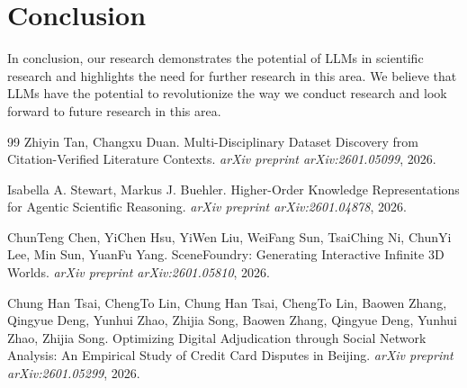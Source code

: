 \documentclass{article}
\begin{document}
\section{Conclusion}
In conclusion, our research demonstrates the potential of LLMs in scientific research and highlights the need for further research in this area. We believe that LLMs have the potential to revolutionize the way we conduct research and look forward to future research in this area.

\begin{thebibliography}{99}
Zhiyin Tan, Changxu Duan. Multi-Disciplinary Dataset Discovery from Citation-Verified Literature Contexts. \textit{arXiv preprint arXiv:2601.05099}, 2026.

Isabella A. Stewart, Markus J. Buehler. Higher-Order Knowledge Representations for Agentic Scientific Reasoning. \textit{arXiv preprint arXiv:2601.04878}, 2026.

ChunTeng Chen, YiChen Hsu, YiWen Liu, WeiFang Sun, TsaiChing Ni, ChunYi Lee, Min Sun, YuanFu Yang. SceneFoundry: Generating Interactive Infinite 3D Worlds. \textit{arXiv preprint arXiv:2601.05810}, 2026.

Chung Han Tsai, ChengTo Lin, Chung Han Tsai, ChengTo Lin, Baowen Zhang, Qingyue Deng, Yunhui Zhao, Zhijia Song, Baowen Zhang, Qingyue Deng, Yunhui Zhao, Zhijia Song. Optimizing Digital Adjudication through Social Network Analysis: An Empirical Study of Credit Card Disputes in Beijing. \textit{arXiv preprint arXiv:2601.05299}, 2026.
\end{thebibliography}
\end{document}
